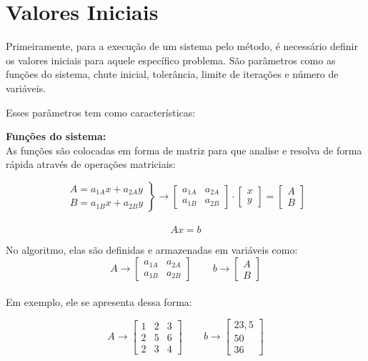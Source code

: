 \documentclass[
12pt,				%
openright,			%
twoside,			%
a4paper,			%
english,			%
french,				%
spanish,			%
brazil				%
]{abntex2_new}
\begin{document}
		
		\section{Valores Iniciais}
		Primeiramente, para a execução de um sistema pelo método, é 
		necessário definir os valores iniciais para aquele 
		específico problema. São parâmetros como as funções do
		sistema,
		chute inicial, tolerância, limite de iterações e número
		de variáveis.
		
		Esses parâmetros tem como características:
		
		\begin{alineas}
			\item{\textbf{Funções do sistema:}\\
				As funções são colocadas em forma de matriz para que
				analise e resolva de forma rápida através de operações
				matriciais:
				
				$$\left.\begin{aligned}
				A=a_{1A} x + a_{2A} y\\
				B=a_{1B} x + a_{2B} y
				\end{aligned}
				\right\} \rightarrow
				\begin{bmatrix}
				a_{1A} & a_{2A} \\
				a_{1B} & a_{2B}
				\end{bmatrix} \cdot
				\begin{bmatrix}
				x \\
				y
				\end{bmatrix}
				= 
				\begin{bmatrix}
				A \\
				B
				\end{bmatrix}
				$$\\
				$$Ax=b$$
				
				No algoritmo, elas são definidas e armazenadas em variáveis como:
				$$	A \rightarrow   \begin{bmatrix}
				a_{1A} & a_{2A} \\
				a_{1B} & a_{2B}
				\end{bmatrix} \hspace{25pt}
				b \rightarrow  \begin{bmatrix}
				A \\
				B
				\end{bmatrix}
				$$\\
				
				Em exemplo, ele se apresenta dessa forma:
				
				$$	A \rightarrow   \begin{bmatrix}
				1 & 2 & 3 \\
				2 & 5 & 6 \\
				2 & 3 & 4
				\end{bmatrix} \hspace{25pt}
				b \rightarrow  \begin{bmatrix}
				23,5 \\
				50 \\
				36
				\end{bmatrix}
				$$\\
				
}
\end{alineas}
\end{document}
